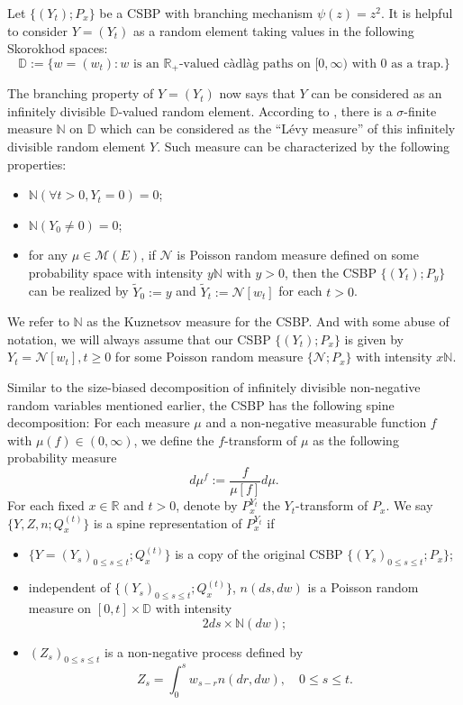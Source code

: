 \documentclass[UTF8]{pkuthss}
\theoremstyle{plain}
\theoremstyle{definition}
\numberwithin{equation}{section}
\begin{document}
	Let $\{(Y_t);P_x\}$ be a CSBP with branching mechanism $\psi(z)=z^2$.
It is helpful to consider $Y=(Y_t)$ as a random element taking values in the following Skorokhod spaces:
\[
\mathbb D:=\{w=(w_t): w \text{ is an $\mathbb R_+$-valued c\`adl\`ag paths on $[0,\infty)$ with $0$ as a trap.}\}
\]

	The branching property of $Y=(Y_t)$ now says that $Y$ can be considered as an infinitely divisible $\mathbb D$-valued random element. 
	According to \cite{DynkinKuznetsov2004Nmeasures}, there is a $\sigma$-finite measure $\mathbb N$ on $\mathbb D$ which can be considered as the ``L\'evy measure'' of this infinitely divisible random element $Y$. Such measure can be characterized by the following properties:
\begin{itemize}
\item
 	$\mathbb N(\forall t>0, Y_t = 0) = 0$;
\item
	$\mathbb N(Y_0\neq 0)=0$;
\item
	for any $\mu\in \mathcal M(E)$, if $\mathcal N$ is Poisson random measure defined on some probability space with intensity $y\mathbb N$ with $y>0$, then the CSBP $\{(Y_t);P_y\}$ can be realized by $\tilde Y_0 := y$ and $\tilde Y_t:= \mathcal N[w_t]$ for each $t>0$.
\end{itemize}
	We refer to $\mathbb N$ as the Kuznetsov measure for the CSBP. 
	And with some abuse of notation, we will always assume that our CSBP $\{(Y_t); P_x\}$ is given by $Y_t = \mathcal N[w_t], t\geq 0$ for some Poisson random measure $\{\mathcal N;P_x\}$ with intensity $x\mathbb N$.

	Similar to the size-biased decomposition of infinitely divisible non-negative random variables mentioned earlier, the CSBP has the following spine decomposition:
	For each measure $\mu$ and a non-negative measurable function $f$ with $\mu(f) \in (0,\infty)$, we define the $f$-transform of $\mu$ as the following probability measure
\[
	d\mu^f:= \frac{f}{\mu[f]} d\mu.
\]
	For each fixed $x\in \mathbb R$ and $t>0$, denote by $P_x^{Y_t}$ the $Y_t$-transform of $P_x$. We say $\{Y,Z,n; Q^{(t)}_x\}$ is a spine representation of $P_x^{Y_t}$ if
\begin{itemize}
\item
	$\{Y=(Y_s)_{0\leq s\leq t}; Q^{(t)}_x\}$ is a copy of the original CSBP $\{(Y_s)_{0\leq s\leq t}; P_x\}$;
\item
	independent of $\{(Y_s)_{0\leq s\leq t}; Q_x^{(t)}\}$, $n(ds,dw)$ is a Poisson random measure on $[0,t]\times \mathbb D$ with intensity
\[
	2ds\times \mathbb N(dw);
\]
\item
	$(Z_s)_{0\leq s\leq t}$ is a non-negative process defined by
\begin{equation}
\label{eq: immigrates for classical spine decomposition for CSBP}
	Z_s = \int_0^s w_{s-r} n(dr,dw),\quad 0\leq s\leq t.
\end{equation}
\end{itemize}
\end{document}
